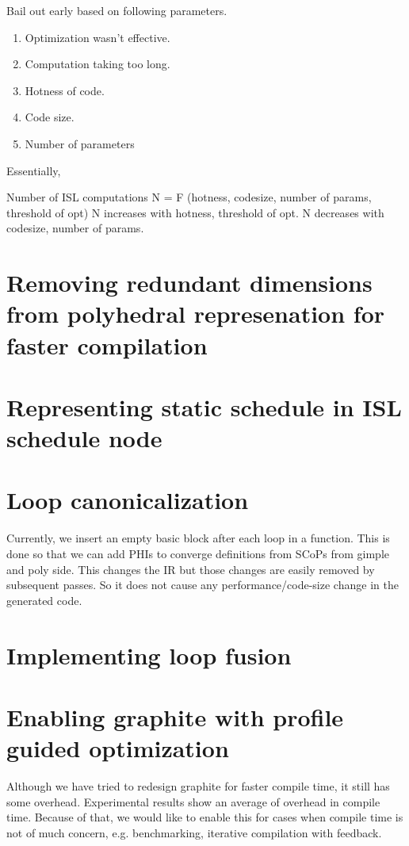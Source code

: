 Bail out early based on following parameters.
\begin{enumerate}
  \item Optimization wasn't effective.
  \item Computation taking too long.
  \item Hotness of code.
  \item Code size.
  \item Number of parameters
\end{enumerate}

Essentially,

Number of ISL computations N = F (hotness, codesize, number of params, threshold of opt)
N increases with hotness, threshold of opt.
N decreases with codesize, number of params.

\section{Removing redundant dimensions from polyhedral represenation for faster compilation}

\section{Representing static schedule in ISL schedule node}

\section{Loop canonicalization}
Currently, we insert an empty basic block after each loop in a function. This is done so that
we can add PHIs to converge definitions from SCoPs from gimple and poly side. This changes
the IR but those changes are easily removed by subsequent passes. So it does not cause any
performance/code-size change in the generated code.


\section{Implementing loop fusion}

\section{Enabling graphite with profile guided optimization}
Although we have tried to redesign graphite for faster compile time, it still has some overhead.
Experimental results show an average of {} overhead in compile time.
Because of that, we would like to enable this for cases when compile time is not of much concern,
e.g. benchmarking, iterative compilation with feedback.

